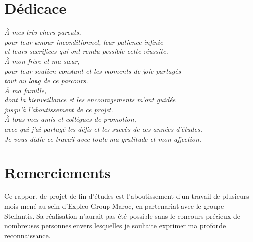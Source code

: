\documentclass[12pt,a4paper]{report}
\begin{document}
\chapter*{D\'edicace}
\thispagestyle{fancy}

\vspace{2cm}
\begin{center}
\textit{\large
\`A mes tr\`es chers parents,\\[0.5cm]
pour leur amour inconditionnel, leur patience infinie\\
et leurs sacrifices qui ont rendu possible cette r\'eussite.\\[1cm]
\`A mon fr\`ere et ma s{\oe}ur,\\[0.5cm]
pour leur soutien constant et les moments de joie partag\'es\\
tout au long de ce parcours.\\[1cm]
\`A ma famille,\\[0.5cm]
dont la bienveillance et les encouragements m'ont guid\'ee\\
jusqu'\`a l'aboutissement de ce projet.\\[1cm]
\`A tous mes amis et coll\`egues de promotion,\\[0.5cm]
avec qui j'ai partag\'e les d\'efis et les succ\`es de ces ann\'ees d'\'etudes.\\[1.5cm]
Je vous d\'edie ce travail avec toute ma gratitude et mon affection.
}
\end{center}

\clearpage

\chapter*{Remerciements}
\thispagestyle{fancy}

Ce rapport de projet de fin d'\'etudes est l'aboutissement d'un travail de plusieurs mois men\'e au sein d'Expleo Group Maroc, en partenariat avec le groupe Stellantis. Sa r\'ealisation n'aurait pas \'et\'e possible sans le concours pr\'ecieux de nombreuses personnes envers lesquelles je souhaite exprimer ma profonde reconnaissance.
\end{document}
